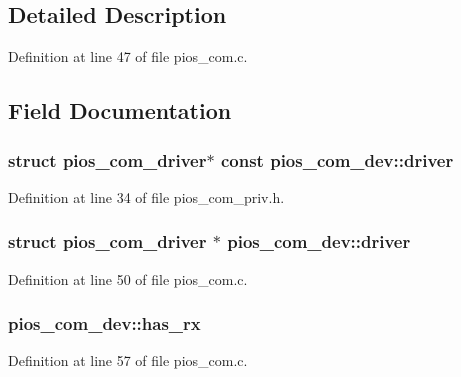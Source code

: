 \subsection{Detailed Description}


Definition at line 47 of file pios\-\_\-com.\-c.



\subsection{Field Documentation}
\hypertarget{structpios__com__dev_ae2174a1f25b3842202d272f0e7588e25}{
\subsubsection[{driver}]{\setlength{\rightskip}{0pt plus 5cm}struct {\bf pios\-\_\-com\-\_\-driver}$\ast$ {\bf const} pios\-\_\-com\-\_\-dev\-::driver}}\label{structpios__com__dev_ae2174a1f25b3842202d272f0e7588e25}


Definition at line 34 of file pios\-\_\-com\-\_\-priv.\-h.

\hypertarget{structpios__com__dev_aece1c2098e93e78821b9b445e9198d3c}{
\subsubsection[{driver}]{\setlength{\rightskip}{0pt plus 5cm}struct {\bf pios\-\_\-com\-\_\-driver} $\ast$ pios\-\_\-com\-\_\-dev\-::driver}}\label{structpios__com__dev_aece1c2098e93e78821b9b445e9198d3c}


Definition at line 50 of file pios\-\_\-com.\-c.

\hypertarget{structpios__com__dev_a0ef5c9630be8df13ab50070bbf65009c}{
\subsubsection[{has\-\_\-rx}]{ pios\-\_\-com\-\_\-dev\-::has\-\_\-rx}}\label{structpios__com__dev_a0ef5c9630be8df13ab50070bbf65009c}


Definition at line 57 of file pios\-\_\-com.\-c.

